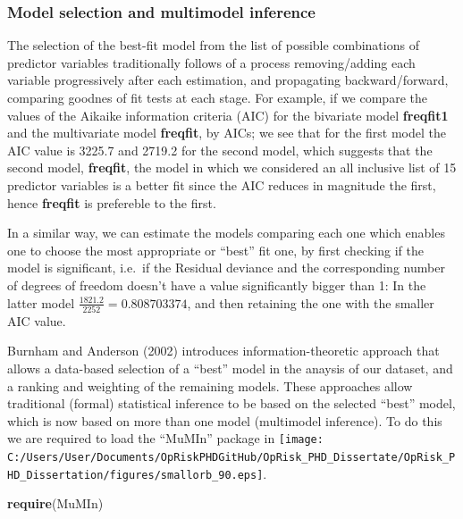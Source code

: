 \documentclass[]{DissertateUSU}
\newenvironment{Shaded}{\begin{snugshade}}{\end{snugshade}}
\newcommand{\KeywordTok}[1]{\textcolor[rgb]{0.13,0.29,0.53}{\textbf{#1}}}
\newcommand{\NormalTok}[1]{#1}
\begin{document}
\doublespacing

\singlespacing

\doublespacing

\subsubsection{Model selection and multimodel inference}

The selection of the best-fit model from the list of possible
combinations of predictor variables traditionally follows of a process
removing/adding each variable progressively after each estimation, and
propagating backward/forward, comparing goodnes of fit tests at each
stage. For example, if we compare the values of the Aikaike information
criteria (AIC) for the bivariate model \textbf{freqfit1} and the
multivariate model \textbf{freqfit}, by AICs; we see that for the first
model the AIC value is 3225.7 and 2719.2 for the second model, which
suggests that the second model, \textbf{freqfit}, the model in which we
considered an all inclusive list of 15 predictor variables is a better
fit since the AIC reduces in magnitude the first, hence \textbf{freqfit}
is prefereble to the first. \medskip

In a similar way, we can estimate the models comparing each one which
enables one to choose the most appropriate or ``best'' fit one, by first
checking if the model is significant, i.e.~if the Residual deviance and
the corresponding number of degrees of freedom doesn't have a value
significantly bigger than 1: In the latter model
\(\frac{1821.2}{2252} = 0.808703374\), and then retaining the one with
the smaller AIC value.\medskip 

Burnham and Anderson (2002) introduces information-theoretic approach
that allows a data-based selection of a ``best'' model in the anaysis of
our dataset, and a ranking and weighting of the remaining models. These
approaches allow traditional (formal) statistical inference to be based
on the selected ``best'' model, which is now based on more than one
model (multimodel inference). To do this we are required to load the
``MuMIn'' package in
\texttt{[image: C:/Users/User/Documents/OpRiskPHDGitHub/OpRisk\_PHD\_Dissertate/OpRisk\_PHD\_Dissertation/figures/smallorb\_90.eps]}.
\medskip

\singlespacing

\begin{Shaded}
\begin{Highlighting}[]
\KeywordTok{require}\NormalTok{(MuMIn)}
\end{Highlighting}
\end{Shaded}
\end{document}
